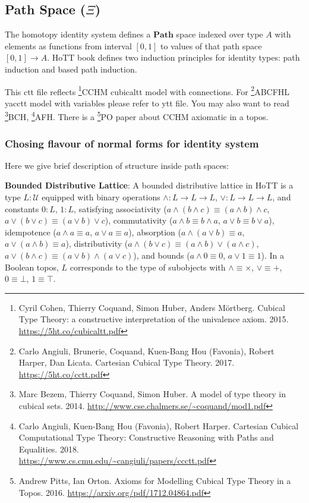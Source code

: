 \documentclass{article}
\begin{document}
\subsection{Path Space ($\Xi$)}

The homotopy identity system defines a $\mathbf{Path}$ space indexed over type $A$
with elements as functions from interval $[0,1]$ to values
of that path space $[0,1] \rightarrow A$. HoTT book
defines two induction principles for identity types:
path induction and based path induction.

This ctt file reflects \footnote{Cyril Cohen, Thierry Coquand, Simon Huber, Anders M{\"{o}}rtberg. Cubical Type Theory: a constructive interpretation of the univalence axiom. 2015. \url{https://5ht.co/cubicaltt.pdf}}{CCHM} cubicaltt model with connections.
For \footnote{Carlo Angiuli, Brunerie, Coquand, Kuen-Bang Hou (Favonia), Robert Harper, Dan Licata. Cartesian Cubical Type Theory. 2017. \url{https://5ht.co/cctt.pdf}}{ABCFHL} yacctt model with
variables please refer to ytt file. You may also want to
read \footnote{Marc Bezem, Thierry Coquand, Simon Huber. A model of type theory in cubical sets. 2014. \url{http://www.cse.chalmers.se/~coquand/mod1.pdf}}{BCH},
\footnote{Carlo Angiuli, Kuen-Bang Hou (Favonia), Robert Harper. Cartesian Cubical Computational Type Theory: Constructive Reasoning with Paths and Equalities. 2018. \\ \url{https://www.cs.cmu.edu/~cangiuli/papers/ccctt.pdf}}{AFH}.
There is a \footnote{Andrew Pitts, Ian Orton. Axioms for Modelling Cubical Type Theory in a Topos. 2016. \url{https://arxiv.org/pdf/1712.04864.pdf}}{PO} paper about CCHM axiomatic in a topos.

\subsubsection*{Chosing flavour of normal forms for identity system}

Here we give brief description of structure inside path spaces:

\textbf{Bounded Distributive Lattice}: A bounded distributive lattice in HoTT is a type $L : \mathcal{U}$ equipped with binary operations $\wedge : L \to L \to L$, $\vee : L \to L \to L$, and constants $0 : L$, $1 : L$, satisfying associativity ($a \wedge (b \wedge c) \equiv (a \wedge b) \wedge c$, $a \vee (b \vee c) \equiv (a \vee b) \vee c$), commutativity ($a \wedge b \equiv b \wedge a$, $a \vee b \equiv b \vee a$), idempotence ($a \wedge a \equiv a$, $a \vee a \equiv a$), absorption ($a \wedge (a \vee b) \equiv a$, $a \vee (a \wedge b) \equiv a$), distributivity ($a \wedge (b \vee c) \equiv (a \wedge b) \vee (a \wedge c)$, $a \vee (b \wedge c) \equiv (a \vee b) \wedge (a \vee c)$), and bounds ($a \wedge 0 \equiv 0$, $a \vee 1 \equiv 1$). In a Boolean topos, $L$ corresponds to the type of subobjects with $\wedge \equiv \times$, $\vee \equiv +$, $0 \equiv \bot$, $1 \equiv \top$.
\end{document}
